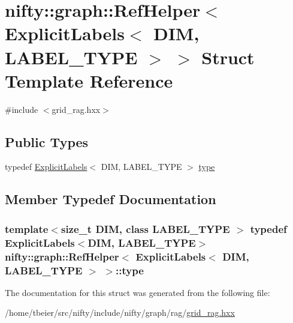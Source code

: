 \hypertarget{structnifty_1_1graph_1_1RefHelper_3_01ExplicitLabels_3_01DIM_00_01LABEL__TYPE_01_4_01_4}{}\section{nifty\+:\+:graph\+:\+:Ref\+Helper$<$ Explicit\+Labels$<$ D\+I\+M, L\+A\+B\+E\+L\+\_\+\+T\+Y\+P\+E $>$ $>$ Struct Template Reference}
\label{structnifty_1_1graph_1_1RefHelper_3_01ExplicitLabels_3_01DIM_00_01LABEL__TYPE_01_4_01_4}


{\ttfamily \#include $<$grid\+\_\+rag.\+hxx$>$}

\subsection*{Public Types}
\begin{DoxyCompactItemize}
\item 
typedef \hyperlink{classnifty_1_1graph_1_1ExplicitLabels}{Explicit\+Labels}$<$ D\+I\+M, L\+A\+B\+E\+L\+\_\+\+T\+Y\+P\+E $>$ \hyperlink{structnifty_1_1graph_1_1RefHelper_3_01ExplicitLabels_3_01DIM_00_01LABEL__TYPE_01_4_01_4_a806ccbe0ab3e833d470e939f1a8d744d}{type}
\end{DoxyCompactItemize}


\subsection{Member Typedef Documentation}
\hypertarget{structnifty_1_1graph_1_1RefHelper_3_01ExplicitLabels_3_01DIM_00_01LABEL__TYPE_01_4_01_4_a806ccbe0ab3e833d470e939f1a8d744d}{}
\subsubsection[{type}]{\setlength{\rightskip}{0pt plus 5cm}template$<$size\+\_\+t D\+I\+M, class L\+A\+B\+E\+L\+\_\+\+T\+Y\+P\+E $>$ typedef {\bf Explicit\+Labels}$<$D\+I\+M, L\+A\+B\+E\+L\+\_\+\+T\+Y\+P\+E$>$ {\bf nifty\+::graph\+::\+Ref\+Helper}$<$ {\bf Explicit\+Labels}$<$ D\+I\+M, L\+A\+B\+E\+L\+\_\+\+T\+Y\+P\+E $>$ $>$\+::{\bf type}}\label{structnifty_1_1graph_1_1RefHelper_3_01ExplicitLabels_3_01DIM_00_01LABEL__TYPE_01_4_01_4_a806ccbe0ab3e833d470e939f1a8d744d}


The documentation for this struct was generated from the following file\+:\begin{DoxyCompactItemize}
\item 
/home/tbeier/src/nifty/include/nifty/graph/rag/\hyperlink{grid__rag_8hxx}{grid\+\_\+rag.\+hxx}\end{DoxyCompactItemize}
